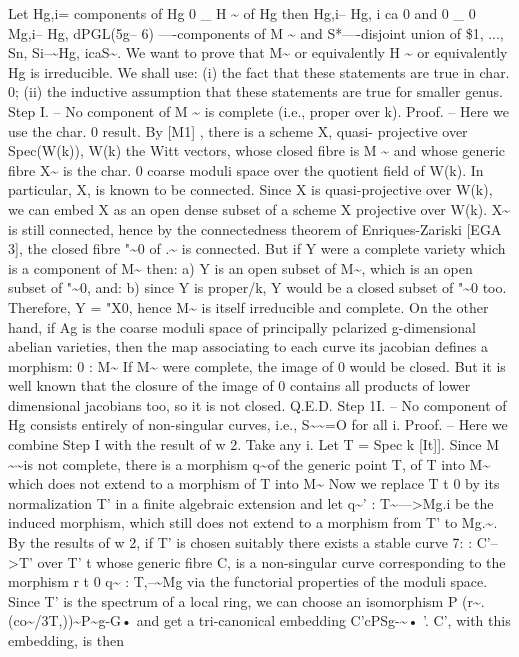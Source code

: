 \documentclass[11pt]{article}
\theoremstyle{plain}
\theoremstyle{definition}
\theoremstyle{remark}
\begin{document}
Let Hg,i= components of Hg 0 \_ H \textasciitilde{} of Hg then Hg,i-- Hg, i ca 0 and 0 \_ 0 Mg,i-- Hg, dPGL(5g-- 6) ----components of M \textasciitilde{} and S*----disjoint union of \$1, ..., Sn, Si--\textasciitilde{}Hg, icaS\textasciitilde{}. We want to prove that M\textasciitilde{} or equivalently H \textasciitilde{} or equivalently Hg is irreducible. We shall use: (i) the fact that these statements are true in char. 0; (ii) the inductive assumption that these statements are true for smaller genus. Step I. -- No component of M \textasciitilde{} is complete (i.e., proper over k). Proof. -- Here we use the char. 0 result. By [M1] , there is a scheme X, quasi- projective over Spec(W(k)), W(k) the Witt vectors, whose closed fibre is M \textasciitilde{} and whose generic fibre X\textasciitilde{} is the char. 0 coarse moduli space over the quotient field of W(k). In particular, X, is known to be connected. Since X is quasi-projective over W(k), we can embed X as an open dense subset of a scheme X projective over W(k). X\textasciitilde{} is still connected, hence by the connectedness theorem of Enriques-Zariski [EGA 3], the closed fibre "\textasciitilde{}0 of .\textasciitilde{} is connected. But if Y were a complete variety which is a component of M\textasciitilde{} then: a) Y is an open subset of M\textasciitilde{}, which is an open subset of "\textasciitilde{}0, and: b) since Y is proper/k, Y would be a closed subset of "\textasciitilde{}0 too. Therefore, Y = "X0, hence M\textasciitilde{} is itself irreducible and complete. On the other hand, if Ag is the coarse moduli space of principally pclarized g-dimensional abelian varieties, then the map associating to each curve its jacobian defines a morphism: 0 : M\textasciitilde{} If M\textasciitilde{} were complete, the image of 0 would be closed. But it is well known that the closure of the image of 0 contains all products of lower dimensional jacobians too, so it is not closed. Q.E.D. Step 1I. -- No component of Hg consists entirely of non-singular curves, i.e., S\textasciitilde{}\textasciitilde{}=O for all i. Proof. -- Here we combine Step I with the result of w 2. Take any i. Let T = Spec k [It]]. Since M \textasciitilde{}\textasciitilde{}is not complete, there is a morphism q\textasciitilde{}of the generic point T, of T into M\textasciitilde{} which does not extend to a morphism of T into M\textasciitilde{} Now we replace T t 0 by its normalization T' in a finite algebraic extension and let q\textasciitilde{}' : T\textasciitilde{}--->Mg.i be the induced morphism, which still does not extend to a morphism from T' to Mg.\textasciitilde{}. By the results of w 2, if T' is chosen suitably there exists a stable curve 7: : C'-->T' over T' t whose generic fibre C, is a non-singular curve corresponding to the morphism r t 0 q\textasciitilde{} : T,--\textasciitilde{}Mg via the functorial properties of the moduli space. Since T' is the spectrum of a local ring, we can choose an isomorphism P (r\textasciitilde{}.(co\textasciitilde{}/3T,))\textasciitilde{}P\textasciitilde{}g-G• and get a tri-canonical embedding C'cPSg-\textasciitilde{}• '. C', with this embedding, is then
\end{document}
